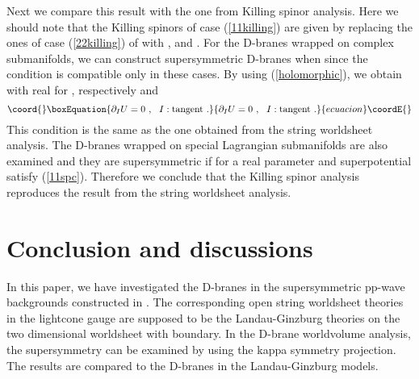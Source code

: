 \documentclass[a4paper,12pt]{article}
\numberwithin{equation}{section}
\providecommand{\jb}{\bar{\jmath}}
\begin{document}
Next we compare this result with the one from Killing spinor analysis.
Here we should note that the Killing spinors of \coordHE{} case 
(\ref{11killing}) are given by replacing the ones of \coordHE{}
case (\ref{22killing}) of \coordHE{} with 
\myHighlight{$\alpha \to - \zeta$}\coordHE{}, \coordHE{} and
\myHighlight{$-i \partial_{\jb} \bar{W} \to \partial_{\jb} U $}\coordHE{}.
For the D-branes wrapped on complex submanifolds,
we can construct supersymmetric D-branes when
\coordHE{} since the condition \myHighlight{$\alpha = - \zeta$}\coordHE{} is
compatible only in these cases.
By using (\ref{holomorphic}), we obtain 
\coordHE{} with real \coordHE{} for \coordHE{}, respectively and
\begin{equation}\coord{}\boxEquation{
 \partial_I U = 0 ~,~~ I : \mbox{tangent} ~.
\label{11spc}
}{
 \partial_I U = 0 ~,~~ I : \mbox{tangent} ~.
}{ecuacion}\coordE{}\end{equation}
This condition is the same as the one obtained from the string worldsheet
 analysis.
The D-branes wrapped on special Lagrangian submanifolds are
 also examined and they are supersymmetric if
\coordHE{} for a real parameter \coordHE{}
and superpotential \coordHE{} satisfy (\ref{11spc}).
Therefore we conclude that the Killing spinor analysis reproduces the
result from the string worldsheet analysis.


\section{Conclusion and discussions}
\label{section-conclusion}

In this paper, we have investigated the D-branes in the supersymmetric
pp-wave backgrounds constructed in \cite{Maldacena:2002fy}.
The corresponding open string worldsheet theories in the
lightcone gauge are supposed to be the Landau-Ginzburg theories on the
two dimensional worldsheet with boundary. 
In the D-brane worldvolume analysis, the supersymmetry can be examined
by using the kappa symmetry projection.
The results are compared to the D-branes in the Landau-Ginzburg models.
\end{document}

